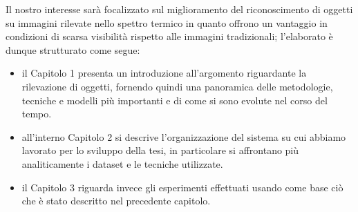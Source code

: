 Il nostro interesse sarà focalizzato sul miglioramento del riconoscimento di oggetti su immagini rilevate nello spettro termico in quanto offrono un vantaggio in condizioni di scarsa visibilità rispetto alle immagini tradizionali; l'elaborato è dunque strutturato come segue:
\begin{itemize}
    \item il Capitolo 1 presenta un introduzione all'argomento riguardante la rilevazione di oggetti, fornendo quindi una panoramica delle metodologie, tecniche e modelli più importanti e di come si sono evolute nel corso del tempo. 
    \item all'interno Capitolo 2 si descrive l'organizzazione del sistema su cui abbiamo lavorato per lo sviluppo della tesi, in particolare si affrontano più analiticamente i dataset e le tecniche utilizzate. 
    \item il Capitolo 3 riguarda invece gli esperimenti effettuati usando come base ciò che è stato descritto nel precedente capitolo. 
\end{itemize}


